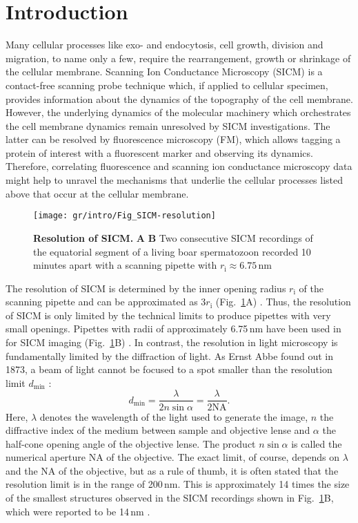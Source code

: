 \section{Introduction}
\label{sec:introduction}
Many cellular processes like exo- and endocytosis, cell growth, division and
migration, to name only a few, require the rearrangement, growth or shrinkage
of the cellular membrane. Scanning Ion Conductance Microscopy (SICM)
\cite{Hansma1989} is a contact-free scanning probe technique which, if applied
to cellular specimen, provides information about the dynamics of the
topography of the cell membrane. However, the underlying dynamics of the
molecular machinery which orchestrates the cell membrane dynamics remain
unresolved by SICM investigations. The latter can be resolved by fluorescence
microscopy (FM), which allows tagging a protein of interest with a fluorescent
marker and observing its dynamics. Therefore, correlating fluorescence and
scanning ion conductance microscopy data might help to unravel the mechanisms
that underlie the cellular processes listed above that occur at the cellular
membrane.

\begin{figure}
  \sidecaption[t]
  \texttt{[image: gr/intro/Fig\_SICM-resolution]}
  \caption{\textbf{Resolution of SICM.} \textbf{A} \textbf{B} Two
    consecutive SICM recordings of the equatorial segment of a living boar
    spermatozoon recorded 10 minutes apart with a scanning pipette with
    $r_\mathrm{i} \approx 6.75\,\text{nm}$}
  \label{fig:sicm-resolution}
\end{figure}
  
The resolution of SICM is determined by the inner opening radius
$r_\mathrm{i}$ of the scanning pipette and can be approximated as
$3r_\mathrm{i}$ (Fig.~\ref{fig:sicm-resolution}A)
\cite{rheinlaender:094905,Rheinlaender2015}.  Thus, the resolution of SICM is
only limited by the technical limits to produce pipettes with very small
openings. Pipettes with radii of approximately 6.75\,nm have been used in for
SICM imaging (Fig.~\ref{fig:sicm-resolution}B) \cite{Shevchuk2008}. In
contrast, the resolution in light microscopy is fundamentally limited by the
diffraction of light. As Ernst Abbe found out in 1873, a beam of light cannot
be focused to a spot smaller than the resolution limit $d_\text{min}$ \cite{Abbe1873}:
\begin{equation}
  d_\text{min} = \frac\lambda{2n\sin\alpha} = \frac\lambda{2\mathrm{NA}}\text{.}
  \label{eq:diffraction-limit}
\end{equation}
Here, $\lambda$ denotes the wavelength of the light used to generate the
image, $n$ the diffractive index of the medium between sample and objective
lense and $\alpha$ the half-cone opening angle of the objective lense. The
product $n\sin\alpha$ is called the numerical aperture $\mathrm{NA}$ of the
objective. The exact limit, of course, depends on $\lambda$ and the NA of the
objective, but as a rule of thumb, it is often stated that the resolution
limit is in the range of 200\,nm. This is approximately 14 times the size of
the smallest structures observed in the SICM recordings shown in
Fig.~\ref{fig:sicm-resolution}B, which were reported to be 14\,nm
\cite{Shevchuk2008}.

